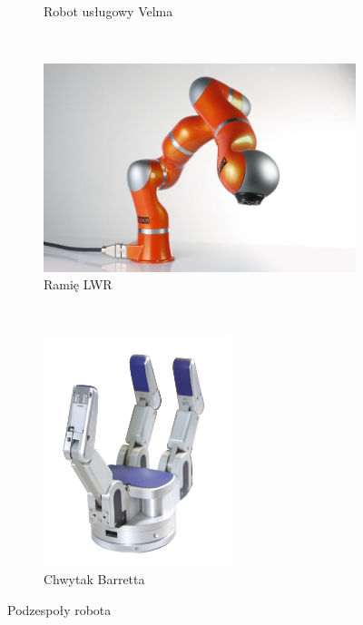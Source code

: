 \documentclass[12pt,a4paper]{article}
\begin{document}
\begin{figure}
\begin{subfigure}[b]{0.3\textwidth}
		\caption{Robot usługowy Velma}
		\label{fig:velma}
    \end{subfigure}
    ~ %
    \begin{subfigure}[b]{0.3\textwidth}
    	\centering
        \includegraphics[width=\textwidth]{lwr}
		\caption{Ramię LWR \cite{lwr}}
		\label{fig:lwr}
    \end{subfigure}
    ~ %
    \begin{subfigure}[b]{0.3\textwidth}
    	\centering
		\includegraphics[width=0.6\textwidth]{icon}
		\caption{Chwytak Barretta\cite{barrett}}
		\label{fig:barrett}
    \end{subfigure}
    \caption{Podzespoły robota}\label{fig:parts}
	\end{figure}
\end{document}
